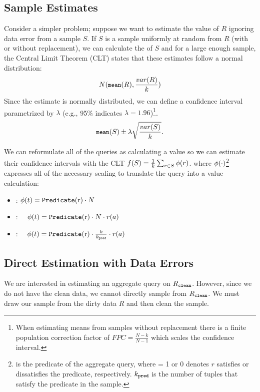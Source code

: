 \subsection{Sample Estimates}\label{subsec:resultestimation}
Consider a simpler problem; suppose we want to estimate the \mean value of $R$ ignoring data error from a sample $S$.
If $S$ is a sample uniformly at random from $R$ (with or without replacement), we can calculate the \mean of $S$ and for a large enough sample, the Central Limit Theorem (CLT) states that these estimates follow a normal distribution:
\[\small
N(\texttt{mean} (R),\frac{var(R)}{k})
\]
Since the estimate is normally distributed, we can define a confidence interval parametrized by $\lambda$ (e.g., 95\% indicates $\lambda=1.96$)\footnote{\scriptsize When estimating means from samples without replacement there is a finite population correction factor of $FPC=\frac{N-k}{N-1}$ which scales the confidence interval.}.
\begin{equation}\small
\texttt{mean} (S) \pm \lambda \sqrt{\frac{var(S)}{k}}.
\end{equation}

We can reformulate all of the queries as calculating a \mean value so we can estimate their confidence intervals with the CLT 
$
f(S) = \frac{1}{k} \sum_{r \in S} \phi (r)
$.
where $\phi (\cdot)$\footnote{ is the predicate of the aggregate query, where  = 1 or 0 denotes $r$ satisfies or dissatisfies the predicate, respectively. $k_{\texttt{pred} }$ is the number of tuples that satisfy the predicate in the sample.} expresses all of the necessary scaling to translate the query into a \mean value calculation:
\begin{itemize}\vspace{-.5em}
\item \countfunc: $\saqpfunc(t) = \Predicate{r} \cdot N$\vspace{-.5em}
\item \sumfunc: ~\, $\saqpfunc(t) = \Predicate{r} \cdot N \cdot r(a)$\vspace{-.5em}
\item \avgfunc: ~\, $\saqpfunc(t) = \Predicate{r} \cdot \frac{k}{k_{\pred}}  \cdot r(a) $ 
\end{itemize}

\subsection{Direct Estimation with Data Errors}
We are interested in estimating an aggregate query on $R_{\texttt{clean} }$.
However, since we do not have the clean data, we cannot directly sample from $R_{\texttt{clean} }$.
We must draw our sample from the dirty data $R$ and then clean the sample.

